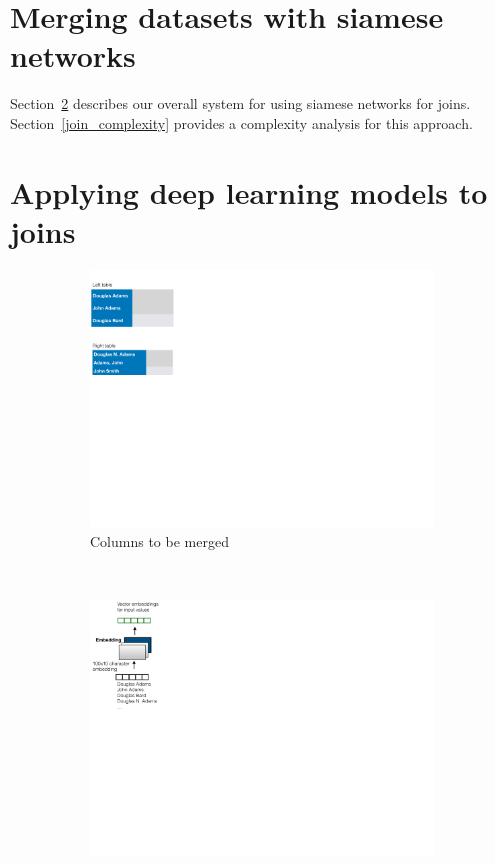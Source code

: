 \section{Merging datasets with siamese networks}
\label{joins}

Section~\ref{join_system} describes our overall system for using siamese networks for joins.  Section~\ref{join_complexity} provides a complexity analysis for this approach.


\section{Applying deep learning models to joins}
\label{join_system}

\begin{figure}[htb]
    \centering
    \begin{subfigure}[t]{0.24\linewidth}
        \centering
        \includegraphics[width=.9\linewidth]{join1}
        \caption{Columns to be merged}
        \label{join1}
    \end{subfigure}%
    ~ 
    \begin{subfigure}[t]{0.24\linewidth}
        \centering 
        \includegraphics[width=.9\linewidth]{join2}

\end{subfigure}
\end{figure}
